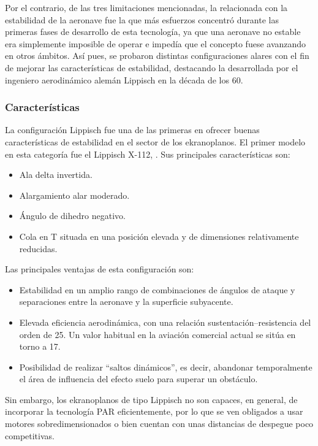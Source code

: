 Por el contrario, de las tres limitaciones mencionadas, la relacionada con la estabilidad de la aeronave fue la que más esfuerzos concentró durante las primeras fases de desarrollo de esta tecnología, ya que una aeronave no estable era simplemente imposible de operar e impedía que el concepto fuese avanzando en otros ámbitos. Así pues, se probaron distintas configuraciones alares con el fin de mejorar las características de estabilidad, destacando la desarrollada por el ingeniero aerodinámico alemán Lippisch en la década de los 60.


\subsubsection{Características}
\label{sec:wig:lippisch:characteristics}

La configuración Lippisch fue una de las primeras en ofrecer buenas características de estabilidad en el sector de los ekranoplanos. El primer modelo en esta categoría fue el Lippisch X-112,
 . Sus principales características son:
\begin{itemize}
\item Ala delta invertida.
\item Alargamiento alar moderado.
\item Ángulo de dihedro negativo.
\item Cola en T situada en una posición elevada y de dimensiones relativamente reducidas.
\end{itemize}


Las principales ventajas de esta configuración son:
\begin{itemize}
\item Estabilidad en un amplio rango de combinaciones de ángulos de ataque y separaciones entre la aeronave y la superficie subyacente.
\item Elevada eficiencia aerodinámica, con una relación sustentación–resistencia del orden de 25. Un valor habitual en la aviación comercial actual se sitúa en torno a 17.
\item Posibilidad de realizar “saltos dinámicos”, es decir, abandonar temporalmente el área de influencia del efecto suelo para superar un obstáculo.
\end{itemize}

Sin embargo, los ekranoplanos de tipo Lippisch no son capaces, en general, de incorporar la tecnología PAR eficientemente, por lo que se ven obligados a usar motores sobredimensionados o bien cuentan con unas distancias de despegue poco competitivas.

